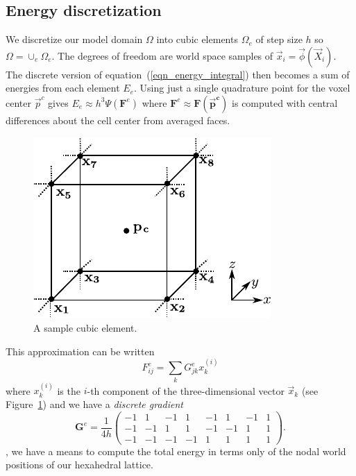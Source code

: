 \subsection{Energy discretization}

We discretize our model domain $\Omega$ into cubic elements $\Omega_e$ of step size $h$ so $\Omega=\cup_e\Omega_e$. The degrees of freedom are world space samples of
$\vec{x}_i=\vec{\phi}(\vec{X}_i)$. The discrete version of
equation~(\ref{eqn_energy_integral}) then becomes a sum of energies from each element $E_e$.  Using just a single quadrature point for the voxel center $\vec{p}^c$ gives $E_e \approx h^3\Psi(\mathbf{F}^e)$ where $\mathbf{F}^e\approx\mathbf{F(\vec{p}^c)}$ is computed with central differences about the cell center from averaged faces.
\begin{figure}
\centering
\includegraphics[width=.35\columnwidth]{elasticity/figures/grid.pdf}
\caption{A sample cubic element.}\label{fig:cubic_element}
\end{figure}
 This approximation can be written
\begin{equation}
F_{ij}^e=\sum_kG_{jk}^ex_k^{(i)}
\label{eqn_discrete_gradient}
\end{equation}
where $x_k^{(i)}$ is the $i$-th component of the three-dimensional vector $\vec{x}_k$ (see Figure~\ref{fig:cubic_element}) and we have
a \emph{discrete gradient}
{\small$$
\mathbf{G}^e=
\frac{1}{4h}
\left(
\begin{array}{cccccccc}
-1 &  1 & -1 &  1 & -1 &  1 & -1 &  1 \\
-1 & -1 &  1 &  1 & -1 & -1 &  1 &  1 \\
-1 & -1 & -1 & -1 &  1 &  1 &  1 &  1
\end{array}
\right).
$$}
, we have a means to compute the total energy in terms only of the nodal world positions of our hexahedral lattice.



